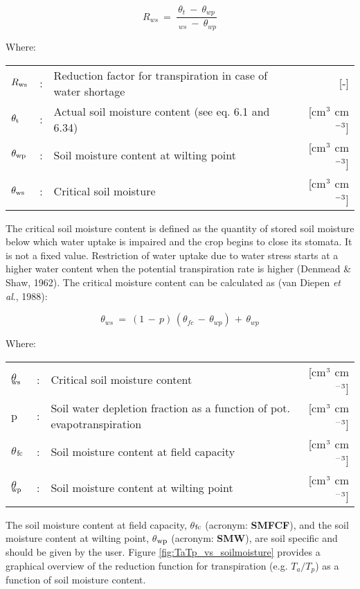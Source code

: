 \begin{equation}
\label{eq:6.8}
R_{ws} ~=~{\frac{\theta_{t} ~-~ \theta  _{wp} }{ \ _{ws} ~-~ \theta_{wp} }}
\end{equation}

Where:\\[5pt]
\begin{tabularx}{\textwidth}{llXr}
	$R_{{\rm ws}}$ &:& Reduction factor for transpiration in case of
	water shortage & [-]\\
	$\theta_{{\rm t}}$ &:& Actual soil moisture content (see eq. 6.1 and 
	6.34) & [cm$^{{\rm 3}}$ cm$^{{\rm -3}}$]\\
	$\theta_{{\rm wp}}$ &:& Soil moisture content at wilting 
	point & [cm$^{{\rm 3}}$ cm$^{{\rm -3}}$]\\
	$\theta_{{\rm ws}}$ &:& Critical soil moisture & [cm$^{{\rm 3}}$ cm$^{{\rm -3}}$]\\ 
\end{tabularx}

The critical soil moisture content is defined as the quantity of stored soil moisture below
which water uptake is impaired and the crop begins to close its stomata. It is not a fixed
value. Restriction of water uptake due to water stress starts at a higher water content
when the potential transpiration rate is higher (Denmead \& Shaw, 1962). The critical
moisture content can be calculated as (van Diepen {\it et al}., 1988):

\begin{equation}
\label{eq:6.9}
\theta_{ws} ~=~ (1\, -\, p )\, (\theta_{fc} \, -\, \theta_{wp} )\, +\, \theta_{wp} 
\end{equation}

Where:\\[5pt]
\begin{tabularx}{\textwidth}{llXr}
	$\theta$$_{{\rm ws}}$ &:& Critical soil moisture content & [cm$^{{\rm 3}}$ cm$^{{\rm -3}}$]\\
	p &:& Soil water depletion fraction as a function 
	of pot. evapotranspiration & [cm$^{{\rm 3}}$ cm$^{{\rm -3}}$]\\
	$\theta$$_{{\rm fc}}$ &:& Soil moisture content at field capacity & [cm$^{{\rm 3}}$ cm$^{{\rm -3}}$]\\
	$\theta$$_{{\rm wp}}$ &:& Soil moisture content at wilting point & [cm$^{{\rm 3}}$ cm$^{{\rm -3}}$]\\
\end{tabularx}

The soil moisture content at field capacity, {\bf $\theta$$_{{\rm fc}}$} (acronym: {\bf SMFCF}), 
and the soil moisture content at wilting point, {\bf $\theta$$_{{\rm wp}}$} (acronym: {\bf SMW}), 
are soil specific and should be given by the user. Figure \ref{fig:TaTp_vs_soilmoisture} provides
a graphical overview of the reduction function for transpiration (e.g. $T_a/T_p$) as a 
function of soil moisture content.

